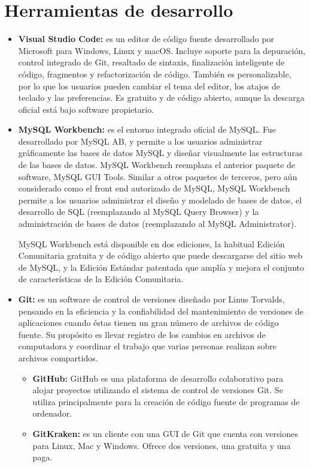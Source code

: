 \section{Herramientas de desarrollo}
	
		\begin{itemize}
			\item  \textbf{Visual Studio Code:} es un editor de código fuente desarrollado por Microsoft para Windows, Linux y macOS. Incluye soporte para la depuración, control integrado de Git, resaltado de sintaxis, finalización inteligente de código, fragmentos y refactorización de código. También es personalizable, por lo que los usuarios pueden cambiar el tema del editor, los atajos de teclado y las preferencias. Es gratuito y de código abierto, aunque la descarga oficial está bajo software propietario.

			\item \textbf{MySQL Workbench:} es el entorno integrado oficial de MySQL. Fue desarrollado por MySQL AB, y permite a los usuarios administrar gráficamente las bases de datos MySQL y diseñar visualmente las estructuras de las bases de datos. MySQL Workbench reemplaza el anterior paquete de software, MySQL GUI Tools. Similar a otros paquetes de terceros, pero aún considerado como el front end autorizado de MySQL, MySQL Workbench permite a los usuarios administrar el diseño y modelado de bases de datos, el desarrollo de SQL (reemplazando al MySQL Query Browser) y la administración de bases de datos (reemplazando al MySQL Administrator).

			MySQL Workbench está disponible en dos ediciones, la habitual Edición Comunitaria gratuita y de código abierto que puede descargarse del sitio web de MySQL, y la Edición Estándar patentada que amplía y mejora el conjunto de características de la Edición Comunitaria.
			
			\item \textbf{Git:} es un software de control de versiones diseñado por Linus Torvalds, pensando en la eficiencia y la confiabilidad del mantenimiento de versiones de aplicaciones cuando éstas tienen un gran número de archivos de código fuente. Su propósito es llevar registro de los cambios en archivos de computadora y coordinar el trabajo que varias personas realizan sobre archivos compartidos.
				\begin{itemize}
				\item \textbf{GitHub:} GitHub es una plataforma de desarrollo colaborativo para alojar proyectos utilizando el sistema de control de versiones Git. Se utiliza principalmente para la creación de código fuente de programas de ordenador.
				\item \textbf{GitKraken:} es un cliente con una GUI de Git que cuenta con versiones para Linux, Mac y Windows. Ofrece dos versiones, una gratuita y una paga.
				\end{itemize}
			

\end{itemize}
